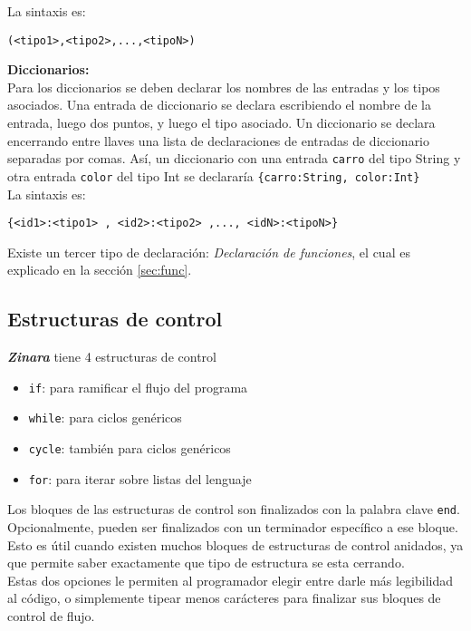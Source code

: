 \documentclass[12pt, spanish]{report}
\begin{document}
La sintaxis es:
\begin{verbatim}
(<tipo1>,<tipo2>,...,<tipoN>)
\end{verbatim}

\textbf{Diccionarios:}\\
Para los diccionarios se deben declarar los nombres de las entradas y
los tipos asociados. Una entrada de diccionario se declara escribiendo
el nombre de la entrada, luego dos puntos, y luego el tipo
asociado. Un diccionario se declara encerrando entre llaves una lista
de declaraciones de entradas de diccionario separadas por
comas. As\'i, un diccionario con una entrada \texttt{carro} del tipo
String y otra entrada \texttt{color} del tipo Int se declarar\'ia
\texttt{\{carro:String, color:Int\}}\\

La sintaxis es:
\begin{verbatim}
{<id1>:<tipo1> , <id2>:<tipo2> ,..., <idN>:<tipoN>}
\end{verbatim}

Existe un tercer tipo de declaraci\'on: \emph{Declaraci\'on de
  funciones}, el cual es explicado en la secci\'on \ref{sec:func}.

\subsection{Estructuras de control}
\label{sec:ecntrl}
\emph{\textbf{Zinara}} tiene 4 estructuras de control
\begin{itemize}
\item \texttt{if}: para ramificar el flujo del programa
\item \texttt{while}: para ciclos gen\'ericos
\item \texttt{cycle}: tambi\'en para ciclos gen\'ericos
\item \texttt{for}: para iterar sobre listas del lenguaje
\end{itemize}

Los bloques de las estructuras de control son finalizados con la
palabra clave \texttt{end}. Opcionalmente, pueden ser finalizados con
un terminador espec\'ifico a ese bloque. Esto es \'util cuando existen
muchos bloques de estructuras de control anidados, ya que permite
saber exactamente que tipo de estructura se esta cerrando.\\

Estas dos opciones le permiten al programador elegir entre darle m\'as
legibilidad al c\'odigo, o simplemente tipear menos car\'acteres para
finalizar sus bloques de control de flujo.\\
\end{document}
